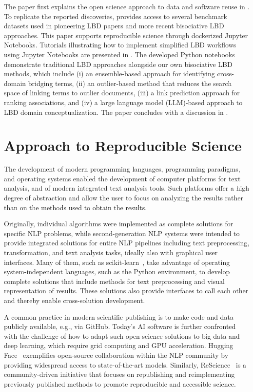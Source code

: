 \documentclass[runningheads]{llncs}
\begin{document}
The paper first explains the open science approach to data and software reuse in . To replicate the reported discoveries,  provides access to several benchmark datasets used in pioneering LBD papers and more recent bisociative LBD approaches. This paper supports reproducible science through dockerized Jupyter Notebooks. Tutorials illustrating how to implement simplified LBD workflows using Jupyter Notebooks are presented in . The developed Python notebooks demonstrate traditional LBD approaches alongside our own bisociative LBD methods, which include (i) an ensemble-based approach for identifying cross-domain bridging terms, (ii) an outlier-based method that reduces the search space of linking terms to outlier documents, (iii) a link prediction approach for ranking associations, and (iv) a large language model (LLM)-based approach to LBD domain conceptualization. The paper concludes with a discussion in .

\section{Approach to Reproducible Science}
\label{sec:reusability}

The development of modern programming languages, programming paradigms, and operating systems enabled the development of computer platforms for text analysis, and of modern integrated text analysis tools. Such platforms offer a high degree of abstraction and allow the user to focus on analyzing the results rather than on the methods used to obtain the results. 

Originally, individual algorithms were implemented as complete solutions for specific NLP problems, while second-generation NLP systems were intended to provide integrated solutions for entire NLP pipelines including text preprocessing, transformation, and text analysis tasks, ideally also with graphical user interfaces. Many of them, such as scikit-learn~\cite{pedregosa2011scikitlearn}, take advantage of operating system-independent languages, such as the Python environment, to develop complete solutions that include methods for text preprocessing and visual representation of results. These solutions also provide interfaces to call each other and thereby enable cross-solution development. 

A common practice in modern scientific publishing is to make code and data publicly available, e.g., via GitHub. Today's AI software is further confronted with the challenge of how to adapt such open science solutions to big data and deep learning, which require grid computing and GPU acceleration. Hugging Face~\cite{wolf2020transformers} exemplifies open-source collaboration within the NLP community by providing widespread access to state-of-the-art models. Similarly, ReScience~\cite{rougier2017sustainable} is a community-driven initiative that focuses on republishing and reimplementing previously published methods to promote reproducible and accessible science.
\end{document}

